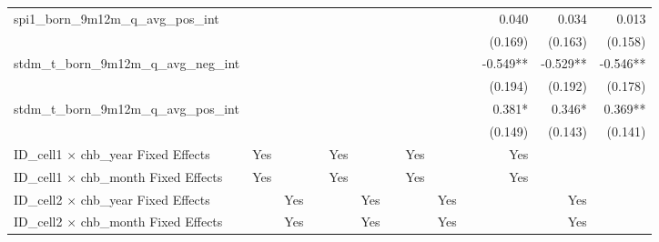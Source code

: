 \begin{tabular}{lrrrrrrrrrrrr}
spi1\_born\_9m12m\_q\_avg\_pos\_int         &              &              &              &              &              &              &              &              &              &        0.040 &        0.034 &        0.013 \\ 
                                            &              &              &              &              &              &              &              &              &              &      (0.169) &      (0.163) &      (0.158) \\ 
stdm\_t\_born\_9m12m\_q\_avg\_neg\_int      &              &              &              &              &              &              &              &              &              &     -0.549** &     -0.529** &     -0.546** \\ 
                                            &              &              &              &              &              &              &              &              &              &      (0.194) &      (0.192) &      (0.178) \\ 
stdm\_t\_born\_9m12m\_q\_avg\_pos\_int      &              &              &              &              &              &              &              &              &              &       0.381* &       0.346* &      0.369** \\ 
                                            &              &              &              &              &              &              &              &              &              &      (0.149) &      (0.143) &      (0.141) \\ 
\midrule
ID\_cell1 $\times$ chb\_year Fixed Effects  &          Yes &              &              &          Yes &              &              &          Yes &              &              &          Yes &              &              \\ 
ID\_cell1 $\times$ chb\_month Fixed Effects &          Yes &              &              &          Yes &              &              &          Yes &              &              &          Yes &              &              \\ 
ID\_cell2 $\times$ chb\_year Fixed Effects  &              &          Yes &              &              &          Yes &              &              &          Yes &              &              &          Yes &              \\ 
ID\_cell2 $\times$ chb\_month Fixed Effects &              &          Yes &              &              &          Yes &              &              &          Yes &              &              &          Yes &              \\ 

\end{tabular}
